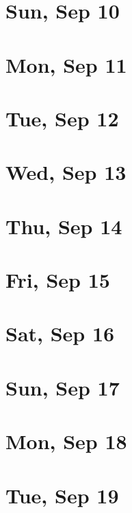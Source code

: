 	\section{Sun, Sep 10}
		
	\section{Mon, Sep 11}
		
	\section{Tue, Sep 12}
		
	\section{Wed, Sep 13}
		
	\section{Thu, Sep 14}
		
	\section{Fri, Sep 15}
		
	\section{Sat, Sep 16}
		
	\section{Sun, Sep 17}
		
	\section{Mon, Sep 18}
		
	\section{Tue, Sep 19}
		
